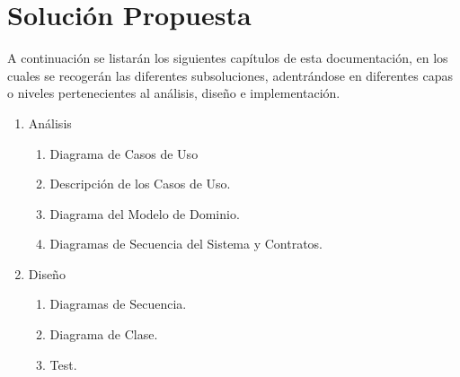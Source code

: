 \section{Soluci\'{o}n Propuesta}
A continuaci\'{o}n se listar\'{a}n los siguientes cap\'{i}tulos de esta documentaci\'{o}n, en los cuales se recoger\'{a}n las diferentes subsoluciones, adentr\'{a}ndose en diferentes capas o niveles pertenecientes al an\'{a}lisis, dise\~{n}o e implementaci\'{o}n.
\begin{enumerate}
\item An\'{a}lisis
\begin{enumerate}
\item Diagrama de Casos de Uso
\item Descripci\'{o}n de los Casos de Uso.
\item Diagrama del Modelo de Dominio.
\item Diagramas de Secuencia del Sistema y Contratos.
\end{enumerate}
\item Dise\~{n}o
\begin{enumerate}
\item Diagramas de Secuencia.
\item Diagrama de Clase.
\item Test.
\end{enumerate}

\end{enumerate}
